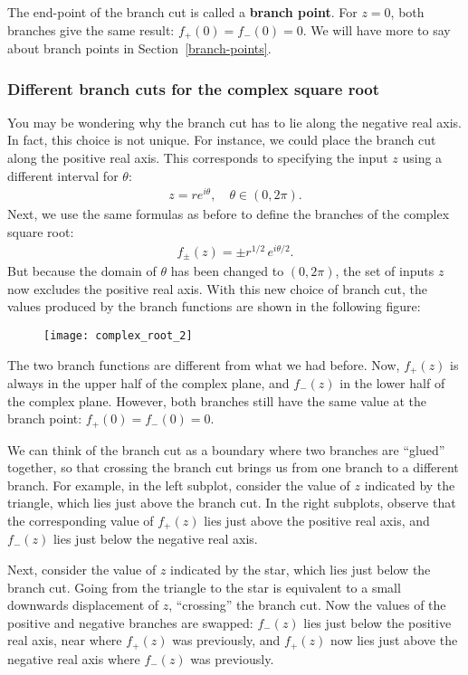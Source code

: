 \documentclass[10pt,a4paper]{article}
\begin{document}
The end-point of the branch cut is called a \textbf{branch point}. For
$z = 0$, both branches give the same result: $f_+(0) = f_-(0) = 0$. We
will have more to say about branch points in
Section~\ref{branch-points}.

\subsubsection{Different branch cuts for the complex square root}
\label{different-branch-cuts-for-the-complex-square-root}

You may be wondering why the branch cut has to lie along the negative
real axis. In fact, this choice is not unique. For instance, we could
place the branch cut along the positive real axis. This corresponds to
specifying the input $z$ using a different interval for $\theta$:
\begin{align}
  z = re^{i\theta}, \quad \theta \in (0, 2\pi).
\end{align}
Next, we use the same formulas as before to define the branches of the
complex square root:
\begin{align}
  f_\pm(z) = \pm r^{1/2} \, e^{i\theta/2}.
\end{align}
But because the domain of $\theta$ has been changed to $(0, 2\pi)$,
the set of inputs $z$ now excludes the positive real axis. With this
new choice of branch cut, the values produced by the branch functions
are shown in the following figure:

\begin{figure}[h]
  \centering\texttt{[image: complex\_root\_2]}
\end{figure}

The two branch functions are different from what we had before.  Now,
$f_+(z)$ is always in the upper half of the complex plane, and
$f_-(z)$ in the lower half of the complex plane. However, both
branches still have the same value at the branch point: $f_+(0) =
f_-(0) = 0$.

We can think of the branch cut as a boundary where two branches are
``glued'' together, so that crossing the branch cut brings us from one
branch to a different branch.  For example, in the left subplot,
consider the value of $z$ indicated by the triangle, which lies just
above the branch cut.  In the right subplots, observe that the
corresponding value of $f_+(z)$ lies just above the positive real
axis, and $f_-(z)$ lies just below the negative real axis.

Next, consider the value of $z$ indicated by the star, which lies just
below the branch cut.  Going from the triangle to the star is
equivalent to a small downwards displacement of $z$, ``crossing'' the
branch cut.  Now the values of the positive and negative branches are
swapped: $f_-(z)$ lies just below the positive real axis, near where
$f_+(z)$ was previously, and $f_+(z)$ now lies just above the negative
real axis where $f_-(z)$ was previously.
\end{document}
